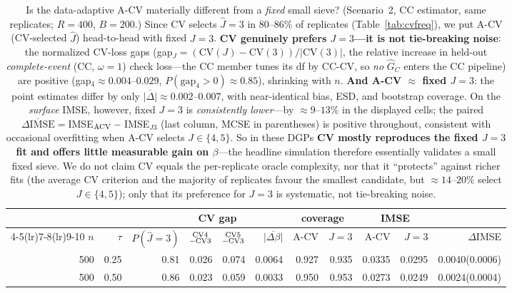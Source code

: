\begin{table}[t]\centering\small
\caption{Is the data-adaptive A-CV materially different from a \emph{fixed} small sieve? (Scenario~2, CC estimator, same replicates; $R=400$, $B=200$.) Since CV selects $\widehat J{=}3$ in $80$--$86\%$ of replicates (Table~\ref{tab:cvfreq}), we put A-CV (CV-selected $\widehat J$) head-to-head with fixed $J{=}3$. \textbf{CV genuinely prefers $J{=}3$---it is not tie-breaking noise}: the normalized CV-loss gaps (gap$_J=(\mathrm{CV}(J){-}\mathrm{CV}(3))/|\mathrm{CV}(3)|$, the relative increase in held-out \emph{complete-event} (CC, $\omega{=}1$) check loss---the CC member tunes its df by CC-CV, so \emph{no} $\widehat G_C$ enters the CC pipeline) are positive (gap$_4\approx0.004$--$0.029$, $P(\text{gap}_4{>}0)\approx0.85$), shrinking with $n$. \textbf{And A-CV $\approx$ fixed $J{=}3$}: the point estimates differ by only $\overline{|\Delta|}\approx0.002$--$0.007$, with near-identical bias, ESD, and bootstrap coverage. On the \emph{surface} IMSE, however, fixed $J{=}3$ is \emph{consistently lower}---by $\approx9$--$13\%$ in the displayed cells; the paired $\overline{\Delta\mathrm{IMSE}}={}$IMSE$_{\rm ACV}-{}$IMSE$_{J3}$ (last column, MCSE in parentheses) is positive throughout, consistent with occasional overfitting when A-CV selects $J{\in}\{4,5\}$. So in these DGPs \textbf{CV mostly reproduces the fixed $J{=}3$ fit and offers little measurable gain on $\beta$}---the headline simulation therefore essentially validates a small fixed sieve. We do not claim CV equals the per-replicate oracle complexity, nor that it ``protects'' against richer fits (the average CV criterion and the majority of replicates favour the smallest candidate, but $\approx14$--$20\%$ select $J{\in}\{4,5\}$); only that its preference for $J{=}3$ is systematic, not tie-breaking noise.}
\label{tab:fixedj}\begin{tabular}{rr r rr r rr rr r}\toprule
&&&\multicolumn{2}{c}{CV gap}&&\multicolumn{2}{c}{coverage}&\multicolumn{2}{c}{IMSE}&\\
\cmidrule(lr){4-5}\cmidrule(lr){7-8}\cmidrule(lr){9-10}
$n$&$\tau$&$P(\widehat J{=}3)$&$\substack{\rm CV4\\-\rm CV3}$&$\substack{\rm CV5\\-\rm CV3}$&$\overline{|\Delta\beta|}$&A-CV&$J{=}3$&A-CV&$J{=}3$&$\Delta$IMSE\\\midrule
500 & 0.25 & 0.81 & 0.026 & 0.074 & 0.0064 & 0.927 & 0.935 & 0.0335 & 0.0295 & 0.0040(0.0006) \\
500 & 0.50 & 0.86 & 0.023 & 0.059 & 0.0033 & 0.950 & 0.953 & 0.0273 & 0.0249 & 0.0024(0.0004) \\

\end{tabular}
\end{table}
